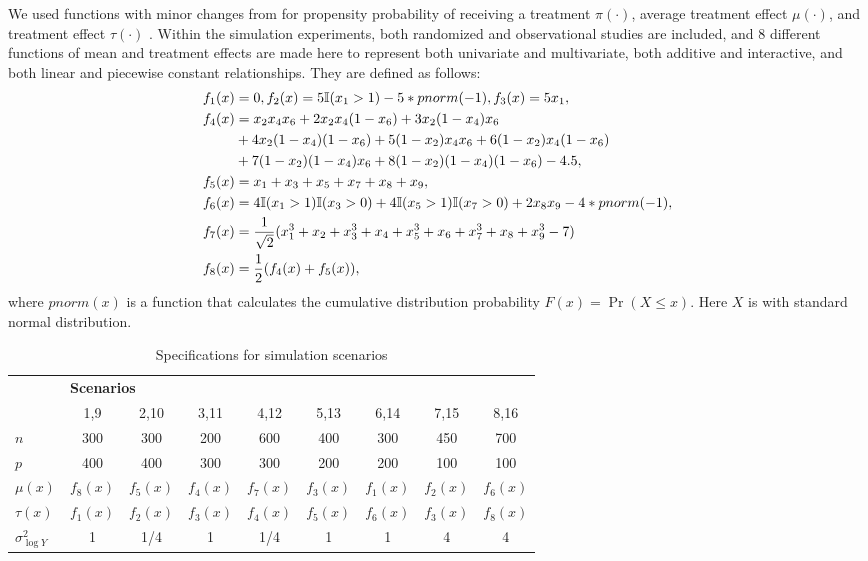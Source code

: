     We used functions with minor changes from \cite{powers2017some} for propensity probability of receiving a treatment $\pi(\cdot)$, average treatment effect $\mu(\cdot)$, and treatment effect $\tau(\cdot)$ . Within the simulation experiments, both randomized and observational studies are included, and 8 different functions of mean and treatment effects are made here to represent both univariate and multivariate, both additive and interactive, and both linear and piecewise constant relationships. They are defined as follows:
    \begin{equation*}
      \begin{split}
        f_1(x) & =  0, f_2(x) = 5 \mathbb{I} (x_1 > 1) - 5 * pnorm(-1),  f_3(x) = 5 x_1,\\
        f_4(x) & = x_2 x_4 x_6 + 2 x_2 x_4 (1 - x_6) + 3x_2 (1 - x_4) x_6 \\
        & + 4 x_2 (1 - x_4) (1 - x_6) + 5 (1 - x_2) x_4 x_6 + 6 (1 - x_2) x_4 (1 - x_6)\\
        & + 7 (1 - x_2) (1 - x_4) x_6 + 8 (1 - x_2) (1 - x_4) (1 - x_6) - 4.5, \\
        f_5(x) & = x_1 + x_3 + x_5 + x_7 + x_8 + x_9, \\
        f_6(x) & = 4 \mathbb{I} (x_1 > 1) \mathbb{I} (x_3 > 0) + 4 \mathbb{I} (x_5 > 1) \mathbb{I} (x_7 > 0) + 2 x_8 x_9 - 4 * pnorm(-1), \\
        f_7(x) & = \frac{1}{\sqrt{2}} (x_1^3 + x_2 + x_3^3 + x_4 + x_5^3 + x_6 + x_7^3 + x_8 + x_9^3 - 7) \\
        f_8(x) & = \frac{1}{2} (f_4(x) + f_5(x)),
      \end{split}
    \end{equation*}
    where $pnorm(x)$ is a function that calculates the cumulative distribution probability $F(x) = \Pr(X \leq x)$. Here $X$ is with standard normal distribution. 

    \begin{table}[htbp]
      \centering
      \caption{Specifications for simulation scenarios}
        \begin{tabular}{l|cccccccc}
        \toprule
        \multirow{2}[2]{*}{} & \multicolumn{8}{l}{\textbf{Scenarios}} \\
              & 1,9   & 2,10  & 3,11  & 4,12  & 5,13  & 6,14  & 7,15  & 8,16 \\
        \midrule
        $n$        & 300       & 300       & 200       & 600      & 400      & 300      & 450      & 700 \\
        $p$        & 400       & 400       & 300       & 300      & 200      & 200      & 100      & 100 \\
        $\mu(x)$   & $f_8(x)$  & $f_5(x)$  & $f_4(x)$  & $f_7(x)$ & $f_3(x)$ & $f_1(x)$ & $f_2(x)$ & $f_6(x)$ \\
        $\tau(x)$  & $f_1(x)$  & $f_2(x)$  & $f_3(x)$  & $f_4(x)$ & $f_5(x)$ & $f_6(x)$ & $f_3(x)$ & $f_8(x)$ \\
        $\sigma_{\log Y}^2 $ & 1   & 1/4   & 1         & 1/4      & 1        & 1        & 4        & 4 \\
        \bottomrule
        \end{tabular}%
      \label{tab:ite_scenarios}%
    \end{table}%

